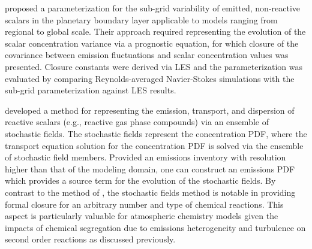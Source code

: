  \textcite{galmarini_modeling_2008} proposed a parameterization for the sub-grid variability of emitted, non-reactive scalars in the planetary boundary layer applicable to models ranging from regional to global scale. Their approach required representing the evolution of the scalar concentration variance via a prognostic equation, for which closure of the covariance between emission fluctuations and scalar concentration values was presented. Closure constants were derived via LES and the parameterization was evaluated by comparing Reynolds-averaged Navier-Stokes simulations with the sub-grid parameterization against LES results. 
 
\textcite{cassiani_stochastic_2010} developed a method for representing the emission, transport, and dispersion of reactive scalars (e.g., reactive gas phase compounds) via an ensemble of stochastic fields. The stochastic fields represent the concentration PDF, where the transport equation solution for the concentration PDF is solved via the ensemble of stochastic field members. Provided an emissions inventory with resolution higher than that of the modeling domain, one can construct an emissions PDF which provides a source term for the evolution of the stochastic fields. By contrast to the method of \textcite{galmarini_modeling_2008}, the stochastic fields method is notable in providing formal closure for an arbitrary number and type of chemical reactions. This aspect is particularly valuable for atmospheric chemistry models given the impacts of chemical segregation due to emissions heterogeneity and turbulence on second order reactions as discussed previously.   

